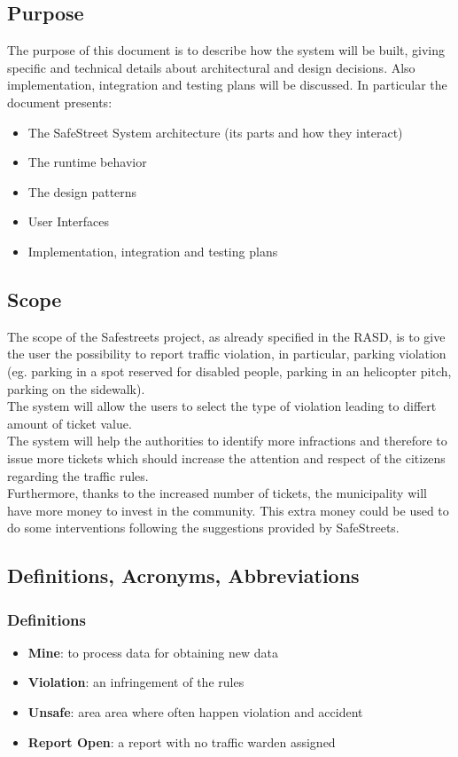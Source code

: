 \documentclass{article}
\begin{document}
\subsection{Purpose}
The purpose of this document is to describe how the system will be built, giving specific and technical details about architectural and design decisions. Also implementation, integration and testing plans will be discussed.
In particular the document presents:
\begin{itemize}
	\item The SafeStreet System architecture (its parts and how they interact)
	\item The runtime behavior
	\item The design patterns
	\item User Interfaces
	\item Implementation, integration and testing plans 
\end{itemize}

\subsection{Scope}
The scope of the Safestreets project, as already specified in the RASD, is to give the user the possibility to report traffic violation, in particular, parking violation (eg. parking in a spot reserved for disabled people, parking in an helicopter pitch, parking on the sidewalk).\\
The system will allow the users to select the type of violation leading to differt amount of ticket value.\\
The system will help the authorities to identify more infractions and therefore to issue more tickets which should increase the attention and respect of the citizens regarding the traffic rules.\\
Furthermore, thanks to the increased number of tickets, the municipality will have more money to invest in the community. This extra money could be used to do some interventions following the suggestions provided by SafeStreets.

\subsection{Definitions, Acronyms, Abbreviations}
\subsubsection{Definitions}
\begin{itemize}
\item \textbf{Mine}: to process data for obtaining new data
\item \textbf{Violation}: an infringement of the rules
\item \textbf{Unsafe}: area area where often happen violation and accident
\item \textbf{Report Open}: a report with no traffic warden assigned
\end{itemize}
\end{document}
